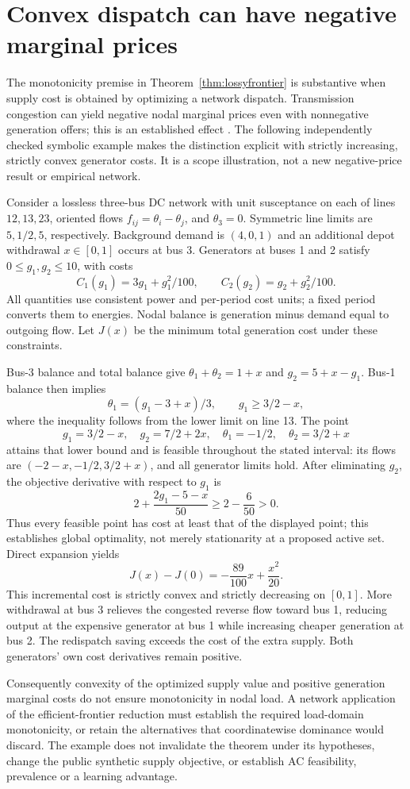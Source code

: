 \section{Convex dispatch can have negative marginal prices}
\label{app:networkmonotonicity}
The monotonicity premise in Theorem~\ref{thm:lossyfrontier} is substantive
when supply cost is obtained by optimizing a network dispatch. Transmission
congestion can yield negative nodal marginal prices even with nonnegative
generation offers; this is an established effect
\citep[Section V-B, Figure 5]{bakerGangammanavar2024prices}.
The following independently checked symbolic example makes the distinction
explicit with strictly increasing, strictly convex generator costs. It is
a scope illustration, not a new negative-price result or empirical network.

Consider a lossless three-bus DC network with unit susceptance on each
of lines $12,13,23$, oriented flows $f_{ij}=\theta_i-\theta_j$, and
$\theta_3=0$. Symmetric line limits are $5,1/2,5$, respectively.
Background demand is $(4,0,1)$ and an additional depot withdrawal
$x\in[0,1]$ occurs at bus 3. Generators at buses 1 and 2 satisfy
$0\le g_1,g_2\le10$, with costs
\[
 C_1(g_1)=3g_1+g_1^2/100,\qquad
 C_2(g_2)=g_2+g_2^2/100.
\]
All quantities use consistent power and per-period cost units; a fixed
period converts them to energies. Nodal balance is generation minus
demand equal to outgoing flow. Let $J(x)$ be the minimum total generation
cost under these constraints.

Bus-3 balance and total balance give
$\theta_1+\theta_2=1+x$ and $g_2=5+x-g_1$. Bus-1 balance then implies
\[
 \theta_1=(g_1-3+x)/3,\qquad g_1\ge3/2-x,
\]
where the inequality follows from the lower limit on line 13. The point
\[
 g_1=3/2-x,\quad g_2=7/2+2x,\quad
 \theta_1=-1/2,\quad\theta_2=3/2+x
\]
attains that lower bound and is feasible throughout the stated interval:
its flows are $(-2-x,-1/2,3/2+x)$, and all generator limits hold.
After eliminating $g_2$, the objective derivative with respect to $g_1$ is
\[
 2+\frac{2g_1-5-x}{50}\ge2-\frac6{50}>0.
\]
Thus every feasible point has cost at least that of the displayed point;
this establishes global optimality, not merely stationarity at a proposed
active set. Direct expansion yields
\[
 J(x)-J(0)=-\frac{89}{100}x+\frac{x^2}{20}.
\]
This incremental cost is strictly convex and strictly decreasing on
$[0,1]$. More withdrawal at bus 3 relieves the congested reverse flow
toward bus 1, reducing output at the expensive generator at bus 1 while
increasing cheaper generation at bus 2. The redispatch saving exceeds the cost of the
extra supply. Both generators' own cost derivatives remain positive.

Consequently convexity of the optimized supply value and positive
generation marginal costs do not ensure monotonicity in nodal load.
A network application of the efficient-frontier reduction must establish
the required load-domain monotonicity, or retain the alternatives that
coordinatewise dominance would discard. The example does not invalidate
the theorem under its hypotheses, change the public synthetic supply
objective, or establish AC feasibility, prevalence or a learning advantage.
